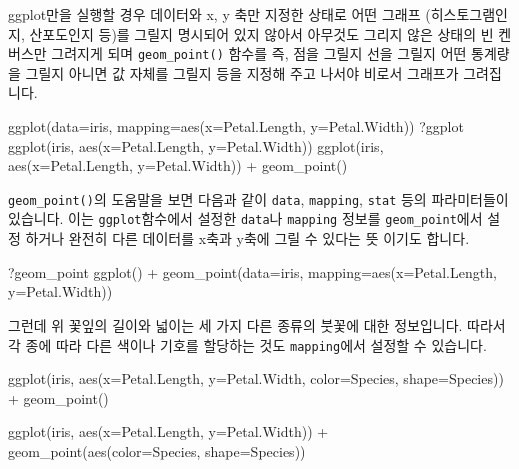 \documentclass[
]{book}
\newenvironment{Shaded}{\begin{snugshade}}{\end{snugshade}}
\newcommand{\AttributeTok}[1]{\textcolor[rgb]{0.77,0.63,0.00}{#1}}
\newcommand{\FunctionTok}[1]{\textcolor[rgb]{0.00,0.00,0.00}{#1}}
\newcommand{\NormalTok}[1]{#1}
\newcommand{\SpecialCharTok}[1]{\textcolor[rgb]{0.00,0.00,0.00}{#1}}
\begin{document}
ggplot만을 실행할 경우 데이터와 x, y 축만 지정한 상태로 어떤 그래프 (히스토그램인지, 산포도인지 등)를 그릴지 명시되어 있지 않아서 아무것도 그리지 않은 상태의 빈 켄버스만 그려지게 되며 \texttt{geom\_point()} 함수를 즉, 점을 그릴지 선을 그릴지 어떤 통계량을 그릴지 아니면 값 자체를 그릴지 등을 지정해 주고 나서야 비로서 그래프가 그려집니다.

\begin{Shaded}
\begin{Highlighting}[]
\FunctionTok{ggplot}\NormalTok{(}\AttributeTok{data=}\NormalTok{iris, }\AttributeTok{mapping=}\FunctionTok{aes}\NormalTok{(}\AttributeTok{x=}\NormalTok{Petal.Length, }\AttributeTok{y=}\NormalTok{Petal.Width))}
\NormalTok{?ggplot}
\FunctionTok{ggplot}\NormalTok{(iris, }\FunctionTok{aes}\NormalTok{(}\AttributeTok{x=}\NormalTok{Petal.Length, }\AttributeTok{y=}\NormalTok{Petal.Width))}
\FunctionTok{ggplot}\NormalTok{(iris, }\FunctionTok{aes}\NormalTok{(}\AttributeTok{x=}\NormalTok{Petal.Length, }\AttributeTok{y=}\NormalTok{Petal.Width)) }\SpecialCharTok{+} \FunctionTok{geom\_point}\NormalTok{()}
\end{Highlighting}
\end{Shaded}

\texttt{geom\_point()}의 도움말을 보면 다음과 같이 \texttt{data}, \texttt{mapping}, \texttt{stat} 등의 파라미터들이 있습니다. 이는 \texttt{ggplot}함수에서 설정한 \texttt{data}나 \texttt{mapping} 정보를 \texttt{geom\_point}에서 설정 하거나 완전히 다른 데이터를 x축과 y축에 그릴 수 있다는 뜻 이기도 합니다.

\begin{Shaded}
\begin{Highlighting}[]
\NormalTok{?geom\_point}
\FunctionTok{ggplot}\NormalTok{() }\SpecialCharTok{+} 
  \FunctionTok{geom\_point}\NormalTok{(}\AttributeTok{data=}\NormalTok{iris, }\AttributeTok{mapping=}\FunctionTok{aes}\NormalTok{(}\AttributeTok{x=}\NormalTok{Petal.Length, }\AttributeTok{y=}\NormalTok{Petal.Width)) }
\end{Highlighting}
\end{Shaded}

그런데 위 꽃잎의 길이와 넓이는 세 가지 다른 종류의 붓꽃에 대한 정보입니다. 따라서 각 종에 따라 다른 색이나 기호를 할당하는 것도 \texttt{mapping}에서 설정할 수 있습니다.

\begin{Shaded}
\begin{Highlighting}[]
\FunctionTok{ggplot}\NormalTok{(iris, }\FunctionTok{aes}\NormalTok{(}\AttributeTok{x=}\NormalTok{Petal.Length, }
                 \AttributeTok{y=}\NormalTok{Petal.Width, }
                 \AttributeTok{color=}\NormalTok{Species, }
                 \AttributeTok{shape=}\NormalTok{Species)) }\SpecialCharTok{+} 
  \FunctionTok{geom\_point}\NormalTok{()}

\FunctionTok{ggplot}\NormalTok{(iris, }\FunctionTok{aes}\NormalTok{(}\AttributeTok{x=}\NormalTok{Petal.Length, }\AttributeTok{y=}\NormalTok{Petal.Width)) }\SpecialCharTok{+} 
  \FunctionTok{geom\_point}\NormalTok{(}\FunctionTok{aes}\NormalTok{(}\AttributeTok{color=}\NormalTok{Species, }\AttributeTok{shape=}\NormalTok{Species))}
\end{Highlighting}
\end{Shaded}
\end{document}
